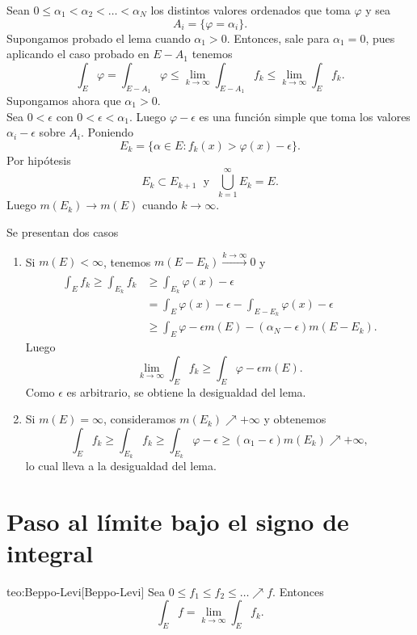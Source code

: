 \begin{demo}
Sean $0\leq \alpha_1< \alpha_2<\ldots < \alpha_N$ los distintos valores ordenados que toma $\varphi$ y sea 
\[  
A_i=\{\varphi=\alpha_i\}.
\]
Supongamos probado el lema cuando $\alpha_1>0$. Entonces, sale para $\alpha_1=0$, pues aplicando el caso probado en $E-A_1$ tenemos 
\[
\int_E \varphi =\int_{E-A_1}\varphi 
\leq \lim\limits_{k\to \infty} \int_{E-A_1} f_k
\leq \lim\limits_{k \to \infty} \int_E f_k.
\]
Supongamos ahora que $\alpha_1>0$.\\ Sea $0<\epsilon$ con $0<\epsilon<\alpha_1$.
Luego $\varphi-\epsilon$ es una funci\'on simple que toma los valores $\alpha_i-\epsilon$ sobre $A_i$. 
Poniendo 
\[
E_k=\{\alpha \in E: f_k(x)> \varphi (x)-\epsilon \}.
\]
Por hip\'otesis
\[
E_k \subset E_{k+1}  \;\mbox { y }\; \bigcup\limits_{k=1}^{\infty}E_k
=E.\]
Luego $m(E_k) \to m(E)$ cuando $k \to \infty$.

Se presentan dos casos
\begin{enumerate}
    \item Si $m(E)<\infty$, tenemos $m(E-E_k) \xrightarrow[]{k \to \infty}0$
     y 
    \[
    \begin{split}
    \int_E f_k \geq \int_{E_k} f_k &\geq \int_{E_k} \varphi(x) -\epsilon
    \\
    &=\int_E \varphi(x)-\epsilon -\int_{E-E_k}\varphi(x)-\epsilon
    \\
    &\geq \int_E \varphi -\epsilon m(E)-(\alpha_N-\epsilon)m(E-E_k).
    \end{split}
         \]
    Luego 
    \[
    \lim\limits_{k \to \infty} \int_E f_k \geq \int_E \varphi-\epsilon m(E).
    \]
    Como $\epsilon$ es arbitrario, se obtiene la desigualdad del lema.
    \item Si $m(E)=\infty$, consideramos $m(E_k)\nearrow +\infty$
    y obtenemos
    \[
    \int_E f_k \geq \int_{E_k} f_k 
    \geq \int_{E_k} \varphi-\epsilon \geq (\alpha_1-\epsilon)m(E_k)\nearrow +\infty, 
    \]
    lo cual lleva a la desigualdad del lema.
\end{enumerate}
\end{demo}

\section{Paso al l\'imite bajo el signo de integral}

\begin{teorema}{teo:Beppo-Levi}[Beppo-Levi]
Sea $0\leq f_1\leq f_2\leq\ldots \nearrow f$. 
Entonces
\[ \int_E f =
\lim\limits_{k \to \infty} \int_E f_k.\]
\end{teorema}
    
